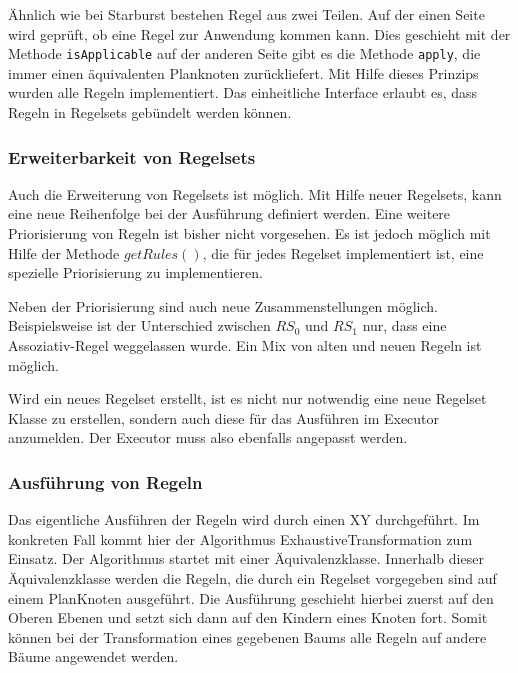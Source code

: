 Ähnlich wie bei Starburst bestehen Regel aus zwei Teilen. Auf der einen Seite wird geprüft, ob eine Regel zur Anwendung kommen kann. Dies geschieht mit der Methode \texttt{isApplicable} auf der anderen Seite gibt es die Methode \texttt{apply}, die immer einen äquivalenten Planknoten zurückliefert. Mit Hilfe dieses Prinzips wurden alle Regeln implementiert. Das einheitliche Interface erlaubt es, dass Regeln in Regelsets gebündelt werden können.



\subsubsection{Erweiterbarkeit von Regelsets}

Auch die Erweiterung von Regelsets ist möglich. Mit Hilfe neuer Regelsets, kann eine neue Reihenfolge bei der Ausführung definiert werden. Eine weitere Priorisierung von Regeln ist bisher nicht vorgesehen. Es ist jedoch möglich mit Hilfe der Methode $getRules()$, die für jedes Regelset implementiert ist, eine spezielle Priorisierung zu implementieren. 

Neben der Priorisierung sind auch neue Zusammenstellungen möglich. Beispielsweise ist der Unterschied zwischen $RS_0$ und $RS_1$ nur, dass eine Assoziativ-Regel weggelassen wurde. Ein Mix von alten und neuen Regeln ist möglich.

Wird ein neues Regelset erstellt, ist es nicht nur notwendig eine neue Regelset Klasse zu erstellen, sondern auch diese für das Ausführen im Executor anzumelden. Der Executor muss also ebenfalls angepasst werden.



\subsubsection{Ausführung von Regeln}

Das eigentliche Ausführen der Regeln wird durch einen XY durchgeführt. Im konkreten Fall kommt hier der Algorithmus ExhaustiveTransformation zum Einsatz. Der Algorithmus startet mit einer Äquivalenzklasse. Innerhalb dieser Äquivalenzklasse werden die Regeln, die durch ein Regelset vorgegeben sind auf einem PlanKnoten ausgeführt. Die Ausführung geschieht hierbei zuerst auf den Oberen Ebenen und setzt sich dann auf den Kindern eines Knoten fort. Somit können bei der Transformation eines gegebenen Baums alle Regeln auf andere Bäume angewendet werden.

